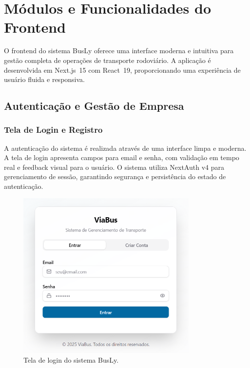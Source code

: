 \chapter{Módulos e Funcionalidades do Frontend}

O frontend do sistema BusLy oferece uma interface moderna e intuitiva para gestão completa de operações de transporte rodoviário. A aplicação é desenvolvida em Next.js~15 com React~19, proporcionando uma experiência de usuário fluida e responsiva.

\section{Autenticação e Gestão de Empresa}

\subsection{Tela de Login e Registro}

A autenticação do sistema é realizada através de uma interface limpa e moderna. A tela de login apresenta campos para email e senha, com validação em tempo real e feedback visual para o usuário. O sistema utiliza NextAuth v4 para gerenciamento de sessão, garantindo segurança e persistência do estado de autenticação.

\begin{figure}[H]
  \centering
  \includegraphics[width=0.8\textwidth]{imagens/tela-login.png}
  \caption{Tela de login do sistema BusLy.}
  \label{fig:tela-login}
\end{figure}

